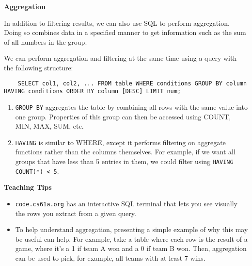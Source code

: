 \textbf{Aggregation}

In addition to filtering results, we can also use SQL to perform aggregation. Doing so combines data in a specified manner to get information such as the sum of all numbers in the group.

We can perform aggregation and filtering at the same time using a query with the following structure:
\begin{lstlisting}
    SELECT col1, col2, ... FROM table WHERE conditions GROUP BY column HAVING conditions ORDER BY column [DESC] LIMIT num;
\end{lstlisting}

\begin{enumerate}
    \item \texttt{GROUP BY} aggregates the table by combining all rows with the same value into one group. Properties of this group can then be accessed using COUNT, MIN, MAX, SUM, etc.
    \item \texttt{HAVING} is similar to WHERE, except it performs filtering on aggregate functions rather than the columns themselves. For example, if we want all groups that have less than 5 entries in them, we could filter using \texttt{HAVING COUNT(*) < 5}.
\end{enumerate}

\begin{guide}
\begin{blocksection}
\textbf{Teaching Tips}
\begin{itemize}
    \item \lstinline{code.cs61a.org} has an interactive SQL terminal that lets you see visually the rows you extract from a given query.
    \item To help understand aggregation, presenting a simple example of why this may be useful can help. For example, take a table where each row is the result of a game,
    where it's a 1 if team A won and a 0 if team B won. Then, aggregation can be used to pick, for example,
    all teams with at least 7 wins.
\end{itemize}
\end{blocksection}
\end{guide}
